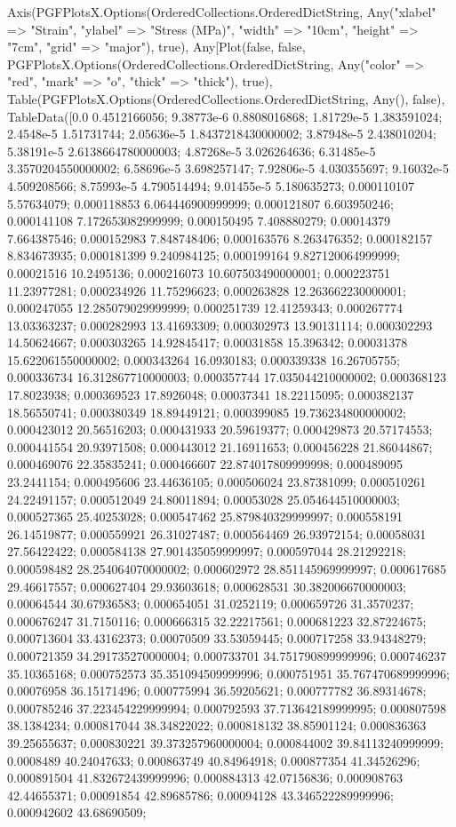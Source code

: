Axis(PGFPlotsX.Options(OrderedCollections.OrderedDict{String, Any}("xlabel" => "Strain", "ylabel" => "Stress (MPa)", "width" => "10cm", "height" => "7cm", "grid" => "major"), true), Any[Plot(false, false, PGFPlotsX.Options(OrderedCollections.OrderedDict{String, Any}("color" => "red", "mark" => "o", "thick" => "thick"), true), Table(PGFPlotsX.Options(OrderedCollections.OrderedDict{String, Any}(), false), TableData([0.0 0.4512166056; 9.38773e-6 0.8808016868; 1.81729e-5 1.383591024; 2.4548e-5 1.51731744; 2.05636e-5 1.8437218430000002; 3.87948e-5 2.438010204; 5.38191e-5 2.6138664780000003; 4.87268e-5 3.026264636; 6.31485e-5 3.3570204550000002; 6.58696e-5 3.698257147; 7.92806e-5 4.030355697; 9.16032e-5 4.509208566; 8.75993e-5 4.790514494; 9.01455e-5 5.180635273; 0.000110107 5.57634079; 0.000118853 6.064446900999999; 0.000121807 6.603950246; 0.000141108 7.172653082999999; 0.000150495 7.408880279; 0.00014379 7.664387546; 0.000152983 7.848748406; 0.000163576 8.263476352; 0.000182157 8.834673935; 0.000181399 9.240984125; 0.000199164 9.827120064999999; 0.00021516 10.2495136; 0.000216073 10.607503490000001; 0.000223751 11.23977281; 0.000234926 11.75296623; 0.000263828 12.263662230000001; 0.000247055 12.285079029999999; 0.000251739 12.41259343; 0.000267774 13.03363237; 0.000282993 13.41693309; 0.000302973 13.90131114; 0.000302293 14.50624667; 0.000303265 14.92845417; 0.00031858 15.396342; 0.00031378 15.622061550000002; 0.000343264 16.0930183; 0.000339338 16.26705755; 0.000336734 16.312867710000003; 0.000357744 17.035044210000002; 0.000368123 17.8023938; 0.000369523 17.8926048; 0.00037341 18.22115095; 0.000382137 18.56550741; 0.000380349 18.89449121; 0.000399085 19.736234800000002; 0.000423012 20.56516203; 0.000431933 20.59619377; 0.000429873 20.57174553; 0.000441554 20.93971508; 0.000443012 21.16911653; 0.000456228 21.86044867; 0.000469076 22.35835241; 0.000466607 22.874017809999998; 0.000489095 23.2441154; 0.000495606 23.44636105; 0.000506024 23.87381099; 0.000510261 24.22491157; 0.000512049 24.80011894; 0.00053028 25.054644510000003; 0.000527365 25.40253028; 0.000547462 25.879840329999997; 0.000558191 26.14519877; 0.000559921 26.31027487; 0.000564469 26.93972154; 0.00058031 27.56422422; 0.000584138 27.901435059999997; 0.000597044 28.21292218; 0.000598482 28.254064070000002; 0.000602972 28.851145969999997; 0.000617685 29.46617557; 0.000627404 29.93603618; 0.000628531 30.382006670000003; 0.00064544 30.67936583; 0.000654051 31.0252119; 0.000659726 31.3570237; 0.000676247 31.7150116; 0.000666315 32.22217561; 0.000681223 32.87224675; 0.000713604 33.43162373; 0.00070509 33.53059445; 0.000717258 33.94348279; 0.000721359 34.291735270000004; 0.000733701 34.751790899999996; 0.000746237 35.10365168; 0.000752573 35.351094509999996; 0.000751951 35.767470689999996; 0.00076958 36.15171496; 0.000775994 36.59205621; 0.000777782 36.89314678; 0.000785246 37.223454229999994; 0.000792593 37.713642189999995; 0.000807598 38.1384234; 0.000817044 38.34822022; 0.000818132 38.85901124; 0.000836363 39.25655637; 0.000830221 39.373257960000004; 0.000844002 39.84113240999999; 0.0008489 40.24047633; 0.000863749 40.84964918; 0.000877354 41.34526296; 0.000891504 41.832672439999996; 0.000884313 42.07156836; 0.000908763 42.44655371; 0.00091854 42.89685786; 0.00094128 43.346522289999996; 0.000942602 43.68690509; 